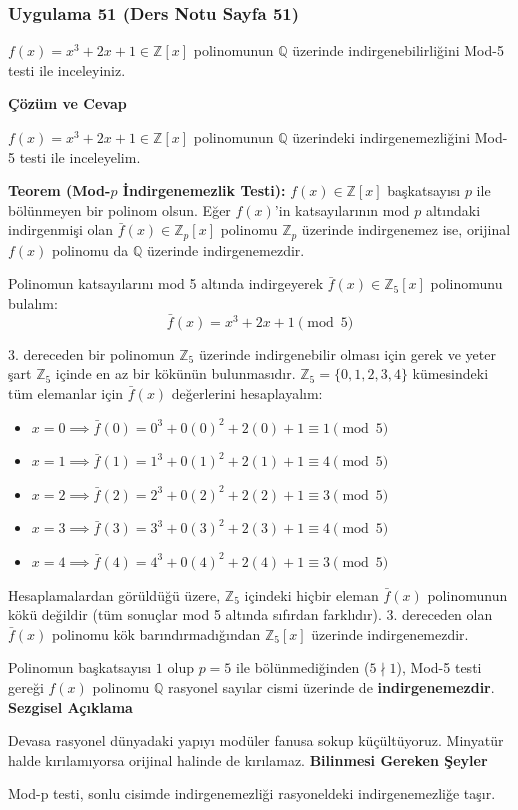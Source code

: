 \documentclass[11pt, a4paper]{article}
\newenvironment{cozum}{
    \vspace{0.5cm}
    \noindent\textcolor{green!60!black}{\faCheckCircle\enspace \textbf{\Large Çözüm ve Cevap}}\par\vspace{0.2cm}
}{}
\newenvironment{sezgisel}{
    \vspace{0.5cm}
    \noindent\textcolor{orange!80!black}{\faLightbulb\enspace \textbf{\Large Sezgisel Açıklama}}\par\vspace{0.2cm}
    \itshape
}{}
\newenvironment{bilgi}{
    \vspace{0.5cm}
    \noindent\textcolor{red!70!black}{\faExclamationTriangle\enspace \textbf{\Large Bilinmesi Gereken Şeyler}}\par\vspace{0.2cm}
}{}
\begin{document}
\newpage
\subsubsection{Uygulama 51 (Ders Notu Sayfa 51)}
\begin{sorubox}
$f(x)=x^3+2x+1 \in \mathbb{Z}[x]$ polinomunun $\mathbb{Q}$ üzerinde indirgenebilirliğini Mod-5 testi ile inceleyiniz.
\end{sorubox}
\begin{cozum}
$f(x) = x^{3} + 2x + 1 \in \mathbb{Z}[x]$ polinomunun $\mathbb{Q}$ üzerindeki indirgenemezliğini Mod-5 testi ile inceleyelim.

\textbf{Teorem (Mod-$p$ İndirgenemezlik Testi):} $f(x) \in \mathbb{Z}[x]$ başkatsayısı $p$ ile bölünmeyen bir polinom olsun. Eğer $f(x)$'in katsayılarının mod $p$ altındaki indirgenmişi olan $\bar{f}(x) \in \mathbb{Z}_p[x]$ polinomu $\mathbb{Z}_p$ üzerinde indirgenemez ise, orijinal $f(x)$ polinomu da $\mathbb{Q}$ üzerinde indirgenemezdir.

Polinomun katsayılarını mod 5 altında indirgeyerek $\bar{f}(x) \in \mathbb{Z}_{5}[x]$ polinomunu bulalım:
\[ \bar{f}(x) = x^{3} + 2x + 1 \pmod{5} \]

3. dereceden bir polinomun $\mathbb{Z}_{5}$ üzerinde indirgenebilir olması için gerek ve yeter şart $\mathbb{Z}_{5}$ içinde en az bir kökünün bulunmasıdır. $\mathbb{Z}_{5} = \{0, 1, 2, 3, 4\}$ kümesindeki tüm elemanlar için $\bar{f}(x)$ değerlerini hesaplayalım:
\begin{itemize}
    \item $x = 0 \implies \bar{f}(0) = 0^3 + 0(0)^2 + 2(0) + 1 \equiv 1 \pmod{5}$
    \item $x = 1 \implies \bar{f}(1) = 1^3 + 0(1)^2 + 2(1) + 1 \equiv 4 \pmod{5}$
    \item $x = 2 \implies \bar{f}(2) = 2^3 + 0(2)^2 + 2(2) + 1 \equiv 3 \pmod{5}$
    \item $x = 3 \implies \bar{f}(3) = 3^3 + 0(3)^2 + 2(3) + 1 \equiv 4 \pmod{5}$
    \item $x = 4 \implies \bar{f}(4) = 4^3 + 0(4)^2 + 2(4) + 1 \equiv 3 \pmod{5}$
\end{itemize}

Hesaplamalardan görüldüğü üzere, $\mathbb{Z}_{5}$ içindeki hiçbir eleman $\bar{f}(x)$ polinomunun kökü değildir (tüm sonuçlar mod 5 altında sıfırdan farklıdır). 3. dereceden olan $\bar{f}(x)$ polinomu kök barındırmadığından $\mathbb{Z}_{5}[x]$ üzerinde indirgenemezdir.

Polinomun başkatsayısı $1$ olup $p = 5$ ile bölünmediğinden ($5 \nmid 1$), Mod-5 testi gereği $f(x)$ polinomu $\mathbb{Q}$ rasyonel sayılar cismi üzerinde de \textbf{indirgenemezdir}.
\end{cozum}
\begin{sezgisel}
Devasa rasyonel dünyadaki yapıyı modüler fanusa sokup küçültüyoruz. Minyatür halde kırılamıyorsa orijinal halinde de kırılamaz.
\end{sezgisel}
\begin{bilgi}
Mod-p testi, sonlu cisimde indirgenemezliği rasyoneldeki indirgenemezliğe taşır.
\end{bilgi}
\end{document}
